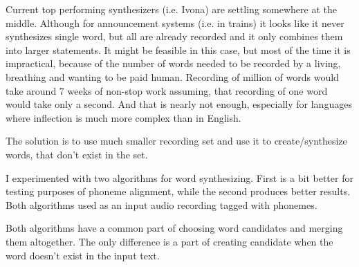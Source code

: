 \documentclass[12pt,a4paper,english]{article}
\begin{document}
Current top performing synthesizers (i.e. Ivona) are settling somewhere at the middle. Although for announcement systems (i.e. in trains) it looks like it never synthesizes single word, but all are already recorded and it only combines them into larger statements. It might be feasible in this case, but most of the time it is impractical, because of the number of words needed to be recorded by a living, breathing and wanting to be paid human. Recording of million of words would take around 7 weeks of non-stop work assuming, that recording of one word would take only a second. And that is nearly not enough, especially for languages where inflection is much more complex than in English. \newline

The solution is to use much smaller recording set and use it to create/synthesize words, that don't exist in the set. \newline

I experimented with two algorithms for word synthesizing. First is a bit better for testing purposes of phoneme alignment, while the second produces better results. Both algorithms used as an input audio recording tagged with phonemes. \newline


Both algorithms have a common part of choosing word candidates and merging them altogether. The only difference is a part of creating candidate when the word doesn't exist in the input text. \newline

\newpage
\end{document}
